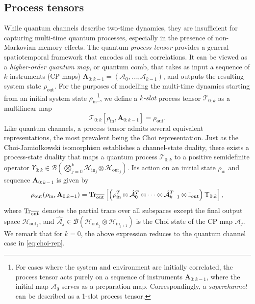 \subsection{Process tensors}
While quantum channels describe two-time dynamics, they are insufficient for capturing multi-time quantum processes, especially in the presence of non-Markovian memory effects. The quantum \emph{process tensor} provides a general spatiotemporal framework that encodes all such correlations. It can be viewed as a \emph{higher-order quantum map}, or quantum comb, that takes as input a sequence of \(k\) instruments (CP maps) \(\mathbf{A}_{0:k-1}=(\mathcal{A}_0,\dots,\mathcal{A}_{k-1})\), and outputs the resulting system state \(\rho_\mathrm{out}\). For the purposes of modelling the multi-time dynamics starting from an initial system state \(\rho_\mathrm{in}\)\footnote{For cases where the system and environment are initially correlated, the process tensor acts purely on a sequence of instruments \(\mathbf{A}_{0:k-1}\), where the initial map \(\mathcal{A}_0\) serves as a preparation map. Correspondingly, a \emph{superchannel} can be described as a 1-slot process tensor.}, we define a \emph{\(k\)-slot} process tensor \(\mathcal{T}_{0:k}\) as a multilinear map
\begin{equation}
\mathcal{T}_{0:k}[\rho_\mathrm{in},\mathbf{A}_{0:k-1}] = \rho_\mathrm{out}.
\end{equation}
Like quantum channels, a process tensor admits several equivalent representations, the most prevalent being the Choi representation. Just as the Choi-Jamiołkowski isomorphism establishes a channel-state duality, there exists a process-state duality that maps a quantum process \(\mathcal{T}_{0:k}\) to a positive semidefinite operator \(\Upsilon_{0:k} \in \mathcal{B}(\bigotimes_{j=0}^k \mathcal{H}_{\mathrm{in}_j} \otimes \mathcal{H}_{\mathrm{out}_j})\). Its action on an initial state \(\rho_{\mathrm{in}}\) and sequence \(\mathbf{A}_{0:k-1}\) is given by
\begin{equation}\label{eq:pt-choi-rep}
    \rho_\mathrm{out}(\rho_\mathrm{in}, \mathbf{A}_{0:k-1}) = \mathrm{Tr}_{\overline{\mathrm{out}}} \left[\left(\rho_{\mathrm{in}}^T\otimes \hat{\mathcal{A}}_0^T\otimes \cdots \otimes\hat{\mathcal{A}}_{k-1}^T \otimes \mathbb{I}_{\mathrm{out}}\right)\Upsilon_{0:k}\right],
\end{equation}
where \(\mathrm{Tr}_{\overline{\mathrm{out}}}\) denotes the partial trace over all subspaces except the final output space \(\mathcal{H}_{\mathrm{out}_k}\), and \(\hat{\mathcal{A}}_j \in \mathcal{B}(\mathcal{H}_{\mathrm{out}_j} \otimes \mathcal{H}_{\mathrm{in}_{j+1}})\) is the Choi state of the CP map \(\mathcal{A}_j\). We remark that for \(k=0\), the above expression reduces to the quantum channel case in \cref{eq:choi-rep}. 

